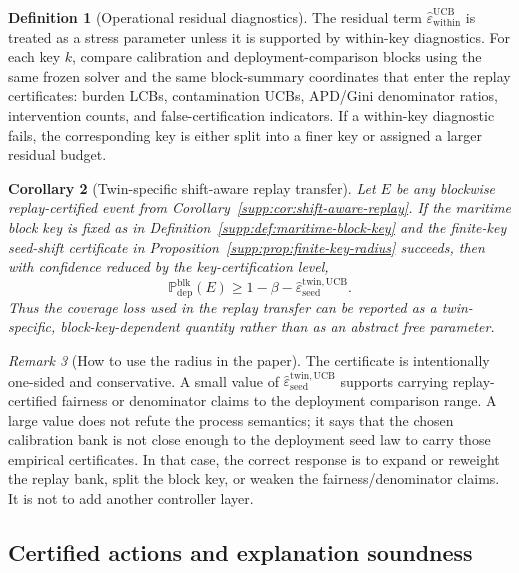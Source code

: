 \documentclass[11pt]{article}
\newcommand{\Prob}{\mathbb{P}}
\newcommand{\1}{\mathbf{1}}
\theoremstyle{definition}
\newtheorem{definition}{Definition}[section]
\theoremstyle{plain}
\newtheorem{corollary}[definition]{Corollary}
\theoremstyle{remark}
\newtheorem{remark}[definition]{Remark}
\begin{document}
\begin{definition}[Operational residual diagnostics]
\label{supp:def:within-diagnostics}
The residual term $\widehat\varepsilon_{\mathrm{within}}^{\mathrm{UCB}}$ is treated as a stress parameter unless it is supported by within-key diagnostics. For each key $k$, compare calibration and deployment-comparison blocks using the same frozen solver and the same block-summary coordinates that enter the replay certificates: burden LCBs, contamination UCBs, APD/Gini denominator ratios, intervention counts, and false-certification indicators. If a within-key diagnostic fails, the corresponding key is either split into a finer key or assigned a larger residual budget.
\end{definition}

\begin{corollary}[Twin-specific shift-aware replay transfer]
\label{supp:cor:twin-specific-transfer}
Let $E$ be any blockwise replay-certified event from Corollary~\ref{supp:cor:shift-aware-replay}. If the maritime block key is fixed as in Definition~\ref{supp:def:maritime-block-key} and the finite-key seed-shift certificate in Proposition~\ref{supp:prop:finite-key-radius} succeeds, then with confidence reduced by the key-certification level,
\[
\Prob_{\mathrm{dep}}^{\mathrm{blk}}(E)
\ge
1-\beta-
\widehat\varepsilon_{\mathrm{seed}}^{\mathrm{twin,UCB}}.
\]
Thus the coverage loss used in the replay transfer can be reported as a twin-specific, block-key-dependent quantity rather than as an abstract free parameter.
\end{corollary}

\begin{remark}[How to use the radius in the paper]
\label{supp:rem:radius-use}
The certificate is intentionally one-sided and conservative. A small value of $\widehat\varepsilon_{\mathrm{seed}}^{\mathrm{twin,UCB}}$ supports carrying replay-certified fairness or denominator claims to the deployment comparison range. A large value does not refute the process semantics; it says that the chosen calibration bank is not close enough to the deployment seed law to carry those empirical certificates. In that case, the correct response is to expand or reweight the replay bank, split the block key, or weaken the fairness/denominator claims. It is not to add another controller layer.
\end{remark}

\subsection{Certified actions and explanation soundness}
\end{document}
